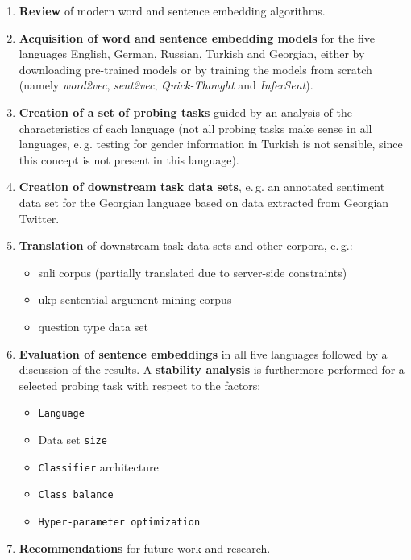 \begin{enumerate}[label=\color{tud9c}\textbf{\theenumi.}]
	\item \textbf{Review} of modern word and sentence embedding algorithms.
	\item \textbf{Acquisition of word and sentence embedding models} for the five languages English, German, Russian,
		Turkish and Georgian, either by downloading pre-trained models or by training the models from scratch
			(namely \textit{word2vec}, \textit{sent2vec}, \textit{Quick-Thought} and \textit{InferSent}).
	\item \textbf{Creation of a set of probing tasks} guided by an analysis of the characteristics of each language
		(not all probing tasks make sense in all languages, e.\,g. testing for gender information in Turkish is not
		sensible, since this concept is not present in this language).
	\item \textbf{Creation of downstream task data sets}, e.\,g. an annotated sentiment data set for the Georgian language 
		based on data extracted from Georgian Twitter.
	\item \textbf{Translation} of downstream task data sets and other corpora, e.\,g.:
	\vspace*{-2mm}
	\begin{itemize}\setlength\itemsep{-1em}
		\item \gls{snli} corpus (partially translated due to server-side constraints)
		\item \gls{ukp} sentential argument mining corpus
		\item {} question type data set
	\end{itemize}
	\item \textbf{Evaluation of sentence embeddings} in all five languages followed by a discussion of the results.
		A \textbf{stability analysis} is furthermore performed for a selected probing task with respect to the factors:
	\vspace*{-2mm}
	\begin{itemize}\setlength\itemsep{-1em}
		\item \texttt{Language}
		\item Data set \texttt{size}
		\item \texttt{Classifier} architecture
		\item \texttt{Class balance}
		\item \texttt{Hyper-parameter optimization}
	\end{itemize}
	\item \textbf{Recommendations} for future work and research.
\end{enumerate}

